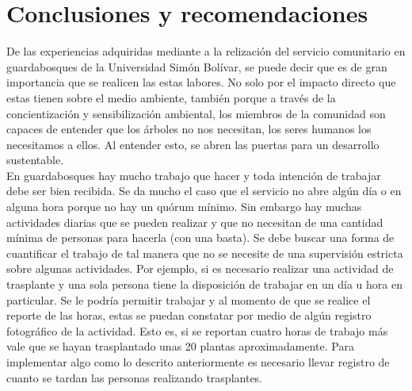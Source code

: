 \chapter*{Conclusiones y recomendaciones}

De las experiencias adquiridas mediante a la relización del servicio comunitario en guardabosques de la Universidad Simón Bolívar, se puede decir que es de gran importancia que se realicen las estas labores. No solo por el impacto directo que estas tienen sobre el medio ambiente, también porque a través de la concientización y sensibilización ambiental, los miembros de la comunidad son capaces de entender que los árboles no nos necesitan, los seres humanos los necesitamos a ellos. Al entender esto, se abren las puertas para un desarrollo sustentable.
\\

En guardabosques hay mucho trabajo que hacer y toda intención de trabajar debe ser bien recibida. Se da mucho el caso que el servicio no abre algún día o en alguna hora porque no hay un quórum mínimo. Sin embargo hay muchas actividades diarias que se pueden realizar y que no necesitan de una cantidad mínima de personas para hacerla (con una basta). Se debe buscar una forma de cuantificar el trabajo de tal manera que no se necesite de una supervisión estricta sobre algunas actividades. Por ejemplo, si es necesario realizar una actividad de trasplante y una sola persona tiene la disposición de trabajar en un día u hora en particular. Se le podría permitir trabajar y al momento de que se realice el reporte de las horas, estas se puedan constatar por medio de algún registro fotográfico de la actividad. Esto es, si se reportan cuatro horas de trabajo más vale que se hayan trasplantado unas 20 plantas aproximadamente. Para implementar algo como lo descrito anteriormente es necesario llevar registro de cuanto se tardan las personas realizando trasplantes.